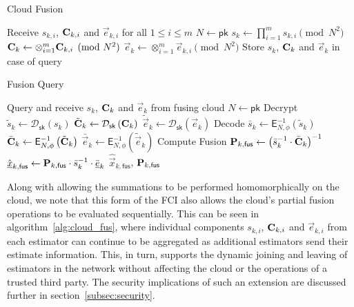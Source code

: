 \begin{algorithm}[htbp]
\caption{Cloud Fusion}\label{alg:cloud_fus}
\begin{algorithmic}[1]
    \State Receive $s_{k,i}$, ${{\mathbf{C}}}_{k,i}$ and $\vec{e}_{k,i}$ for all $1\leq i \leq m$
    \State $N \gets \mathsf{pk}$
    \State $s_k \gets \prod_{i=1}^{m} s_{k,i} \pmod{N^2}$
    \State ${{\mathbf{C}}}_k \gets \otimes_{i=1}^{m} {{\mathbf{C}}}_{k,i} \pmod{N^2}$
    \State $\vec{e}_k \gets \otimes_{i=1}^{m} \vec{e}_{k,i} \pmod{N^2}$
    \State Store $s_k$, ${{\mathbf{C}}}_k$ and $\vec{e}_k$ in case of query
    \EndProcedure
\end{algorithmic}
\end{algorithm}
\begin{algorithm}[htbp]
\caption{Fusion Query}\label{alg:fus_query}
\begin{algorithmic}[1]
    \State Query and receive $s_k$, ${{\mathbf{C}}}_k$ and $\vec{e}_k$ from fusing cloud
    \State $N \gets \mathsf{pk}$
    \LineComment Decrypt
    \State $\tilde{s}_k \gets \mathcal{D}_{\mathsf{sk}}\left(s_k\right)$
    \State $\tilde{{{\mathbf{C}}}}_k \gets \mathcal{D}_{\mathsf{sk}}\left({{\mathbf{C}}}_k\right)$
    \State $\tilde{\vec{e}}_k \gets \mathcal{D}_{\mathsf{sk}}\left(\vec{e}_k\right)$
    \LineComment Decode
    \State $\bar{s}_k \gets \mathsf{E}^{-1}_{N,\phi}\left(\tilde{s}_k\right)$
    \State $\bar{{{\mathbf{C}}}}_k \gets \mathsf{E}^{-1}_{N,\phi}\left(\tilde{{{\mathbf{C}}}}_k\right)$
    \State $\bar{\vec{e}}_k \gets \mathsf{E}^{-1}_{N,\phi}\left(\tilde{\vec{e}}_k\right)$
    \LineComment Compute Fusion
    \State ${{\mathbf{P}}}_{k,\mathsf{fus}} \gets \left(\bar{s}_k^{-1} \cdot \bar{{{\mathbf{C}}}}_k\right)^{-1}$
    \State $\hat{{\underline{x}}}_{k,\mathsf{fus}} \gets {\ensuremath{{\mathbf{P}}}}_{k,\mathsf{fus}} \cdot \bar{s}_k^{-1} \cdot \bar{{\underline{e}}}_k$
    \State \Return $\hat{\vec{x}}_{k,\mathsf{fus}}$, ${{\mathbf{P}}}_{k,\mathsf{fus}}$
    \EndProcedure
\end{algorithmic}
\end{algorithm}

\begin{remark}\label{rem:seq_extension}
    Along with allowing the summations to be performed homomorphically on the cloud, we note that this form of the FCI also allows the cloud's partial fusion operations to be evaluated sequentially. This can be seen in algorithm~\ref{alg:cloud_fus}, where individual components $s_{k,i}$, ${{\mathbf{C}}}_{k,i}$ and $\vec{e}_{k,i}$ from each estimator can continue to be aggregated as additional estimators send their estimate information. This, in turn, supports the dynamic joining and leaving of estimators in the network without affecting the cloud or the operations of a trusted third party. The security implications of such an extension are discussed further in section~\ref{subsec:security}.
\end{remark}

